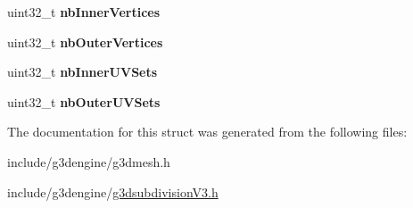 \begin{DoxyCompactItemize}
uint32\+\_\+t {\bfseries nb\+Inner\+Vertices}
\item 
\mbox{\label{struct__G3DSUBDIVISION_a3d65dc1353d546a805c1b1cdb3c6a634}} 
uint32\+\_\+t {\bfseries nb\+Outer\+Vertices}
\item 
\mbox{\label{struct__G3DSUBDIVISION_a3672cd8ec435d7d50184d375e52055d5}} 
uint32\+\_\+t {\bfseries nb\+Inner\+U\+V\+Sets}
\item 
\mbox{\label{struct__G3DSUBDIVISION_a2494639046183f34315650a8ca16faf9}} 
uint32\+\_\+t {\bfseries nb\+Outer\+U\+V\+Sets}
\end{DoxyCompactItemize}


The documentation for this struct was generated from the following files\+:\begin{DoxyCompactItemize}
\item 
include/g3dengine/g3dmesh.\+h\item 
include/g3dengine/\hyperlink{g3dsubdivisionV3_8h}{g3dsubdivision\+V3.\+h}\end{DoxyCompactItemize}
